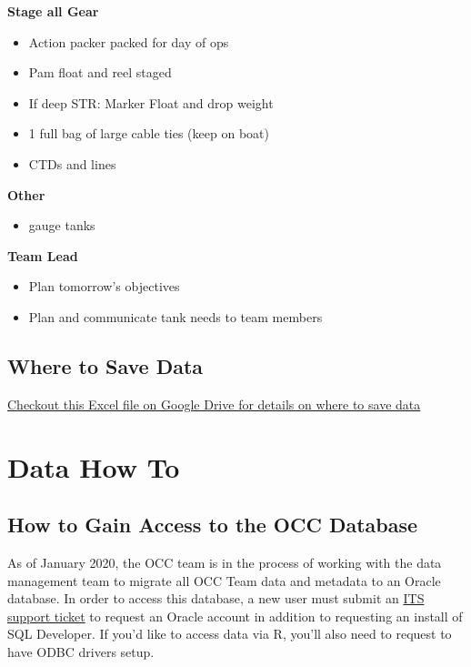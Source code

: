 \documentclass[]{book}
\providecommand{\tightlist}{%
  \setlength{\itemsep}{0pt}\setlength{\parskip}{0pt}}
\begin{document}
\textbf{Stage all Gear}

\begin{itemize}
\tightlist
\item
  Action packer packed for day of ops
\item
  Pam float and reel staged
\item
  If deep STR: Marker Float and drop weight
\item
  1 full bag of large cable ties (keep on boat)
\item
  CTDs and lines
\end{itemize}

\textbf{Other}

\begin{itemize}
\tightlist
\item
  gauge tanks
\end{itemize}

\textbf{Team Lead}

\begin{itemize}
\tightlist
\item
  Plan tomorrow's objectives
\item
  Plan and communicate tank needs to team members
\end{itemize}

\hypertarget{where-to-save-data}{%
\section{Where to Save Data}\label{where-to-save-data}}

\href{https://drive.google.com/open?id=16l1OQgGEunLoADh_MEGyIfbQL2w0u6aw}{Checkout this Excel file on Google Drive for details on where to save data}

\hypertarget{data_how_to}{%
\chapter{Data How To}\label{data_how_to}}

\hypertarget{how-to-gain-access-to-the-occ-database}{%
\section{How to Gain Access to the OCC Database}\label{how-to-gain-access-to-the-occ-database}}

As of January 2020, the OCC team is in the process of working with the data management team to migrate all OCC Team data and metadata to an Oracle database. In order to access this database, a new user must submit an \href{https://www.st.nmfs.noaa.gov/jira/login.jsp?permissionViolation=true\&os_destination=\%2Fbrowse\%2FPICITS-181121\%3Ffilter\%3D-2\&page_caps=\&user_role=}{ITS support ticket} to request an Oracle account in addition to requesting an install of SQL Developer. If you'd like to access data via R, you'll also need to request to have ODBC drivers setup.
\end{document}

